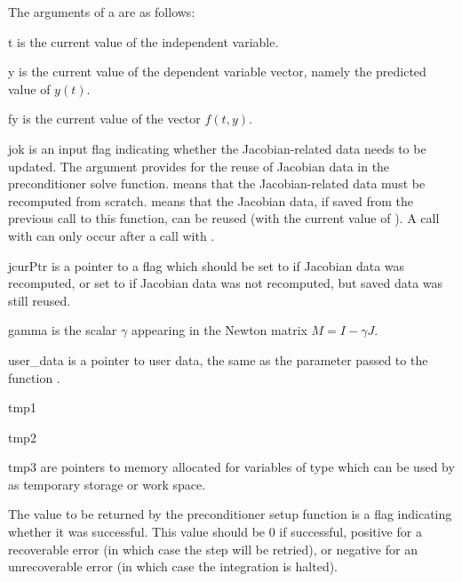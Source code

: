 {
  The arguments of a  are as follows:
  \begin{args}
  \item[t]
    is the current value of the independent variable.
  \item[y]
    is the current value of the dependent variable vector, 
    namely the predicted value of $y(t)$.
  \item[fy]
    is the current value of the vector $f(t,y)$.                    
  \item[jok]
    is an input flag indicating whether the Jacobian-related   
    data needs to be updated. The  argument provides for 
    the reuse of Jacobian data in the preconditioner solve function.
     means that the Jacobian-related data   
    must be recomputed from scratch.                                 
      means that the Jacobian data, if saved from 
    the previous call to this function, can be reused      
    (with the current value of ).            
    A call with  can only occur after   
    a call with .
  \item[jcurPtr]
    is a pointer to a flag which should be
    set to  if Jacobian data was recomputed, or set
    to  if Jacobian data was not           
    recomputed, but saved data was still reused.
  \item[gamma]
    is the scalar $\gamma$ appearing in the Newton matrix $M = I - \gamma J$.
  \item[user\_data]
    is a pointer to user data, the same as the       
    parameter passed to the function .
  \item[tmp1]
  \item[tmp2]
  \item[tmp3]
    are pointers to memory allocated    
    for variables of type  which can be used by           
     as temporary storage or work space.    
  \end{args}
}
{
  The value to be returned by the preconditioner setup function is a flag
  indicating whether it was successful.  This value should be $0$ if successful, 
  positive for a recoverable error (in which case the step will be retried), or
  negative for an unrecoverable error (in which case the integration is halted). 
}
